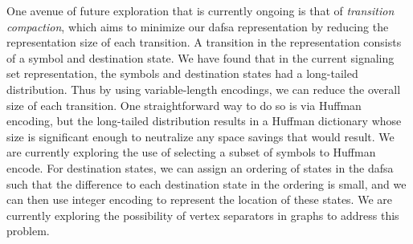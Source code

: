 One avenue of future exploration that is currently ongoing is that of
\emph{transition compaction}, which aims to minimize our \ac{dafsa}
representation by reducing the representation size of each transition. A
transition in the representation consists of a symbol and destination state. We
have found that in the current signaling set representation, the symbols and
destination states had a long-tailed distribution. Thus by using variable-length
encodings, we can reduce the overall size of each transition. One
straightforward way to do so is via Huffman encoding, but the long-tailed
distribution results in a Huffman dictionary whose size is significant enough to
neutralize any space savings that would result. We are currently exploring the
use of selecting a subset of symbols to Huffman encode. For destination states,
we can assign an ordering of states in the \ac{dafsa} such that the difference
to each destination state in the ordering is small, and we can then use integer encoding to
represent the location of these states. We are currently exploring the
possibility of vertex separators in graphs to address this problem.


